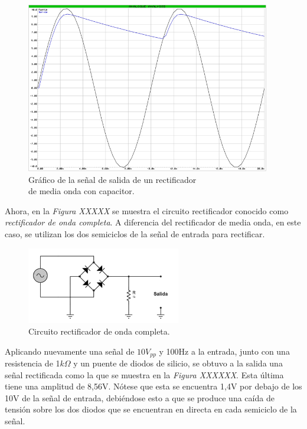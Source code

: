 \documentclass{article}
\begin{document}
\newpage
\begin{figure}[h]
	\centering
	\includegraphics[width=0.95\textwidth]{images/4-4-4-grafico-circuito-rectificador-media-onda-con-filtro.jpg}
	\medskip
	\caption{Gráfico de la señal de salida de un rectificador\\ de media onda con capacitor.}
\end{figure}
\bigskip\bigskip


	Ahora, en la \textit{Figura XXXXX} se muestra el circuito rectificador conocido como \textit{rectificador de onda completa}. A diferencia del rectificador de media onda, en este caso, se utilizan los dos semiciclos  de la señal de entrada para rectificar.
\bigskip\bigskip
	

\begin{figure}[h]
	\centering
	\includegraphics[width=0.60\textwidth]{images/4-4-5-circuito-rectificador-onda-completa.jpg}
	\medskip
	\caption{Circuito rectificador de onda completa.}
\end{figure}
\bigskip\bigskip


	Aplicando nuevamente una señal de $10V_{pp}$ y 100Hz a la entrada, junto con una resistencia de 1$k\Omega$ y un puente de diodos de silicio, se obtuvo a la salida una señal rectificada como la que se muestra en la \textit{Figura XXXXXX}. Esta última tiene una amplitud de 8,56V. Nótese que esta se encuentra 1,4V por debajo de los 10V de la señal de entrada, debiéndose esto a que se produce una caída de tensión sobre los dos diodos que se encuentran en directa en cada semiciclo de la señal. 
\bigskip
\end{document}
